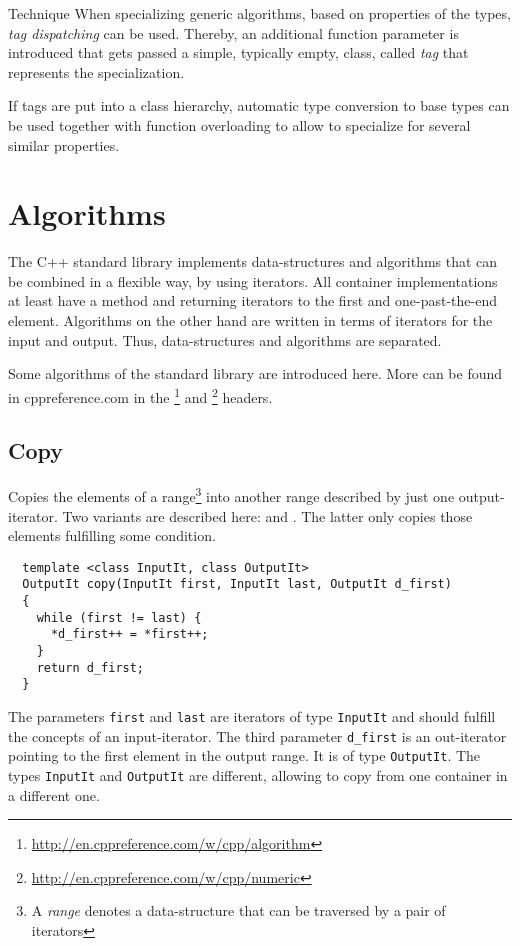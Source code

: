 \begin{guideline}{Technique}
  When specializing generic algorithms, based on properties of the types, \emph{tag dispatching} can be used.
  Thereby, an additional function parameter is introduced that gets passed a simple, typically empty, class,
  called \emph{tag} that represents the specialization.

  If tags are put into a class hierarchy, automatic type conversion to base types can be used together with
  function overloading to allow to specialize for several similar properties.
\end{guideline}


\section{Algorithms}
The C++ standard library implements data-structures and algorithms that can be combined in a flexible way, by using iterators. All container
implementations at least have a method  and  returning iterators to the first and one-past-the-end element.
Algorithms on the other hand are written in terms of iterators for the input and output. Thus, data-structures and algorithms are separated.

Some algorithms of the standard library are introduced here. More can be found in cppreference.com in the %
\footnote{\url{http://en.cppreference.com/w/cpp/algorithm}} and \footnote{\url{http://en.cppreference.com/w/cpp/numeric}} headers.


\subsection{Copy}
Copies the elements of a range\footnote{A \emph{range} denotes a data-structure that can be traversed by a pair of iterators} \cpp{[first, last)}
into another range described by just one output-iterator. Two variants are described here:  and . The latter
only copies those elements fulfilling some condition.
%
\begin{samepage}
\begin{verbatim}
  template <class InputIt, class OutputIt>
  OutputIt copy(InputIt first, InputIt last, OutputIt d_first)
  {
    while (first != last) {
      *d_first++ = *first++;
    }
    return d_first;
  }
\end{verbatim}
\end{samepage}
%
The parameters \texttt{first} and \texttt{last} are iterators of type \texttt{InputIt} and should fulfill the concepts of an input-iterator. The
third parameter \texttt{d\_first} is an out-iterator pointing to the first element in the output range. It is of type \texttt{OutputIt}. The
types \texttt{InputIt} and \texttt{OutputIt} are different, allowing to copy from one container in a different one.

